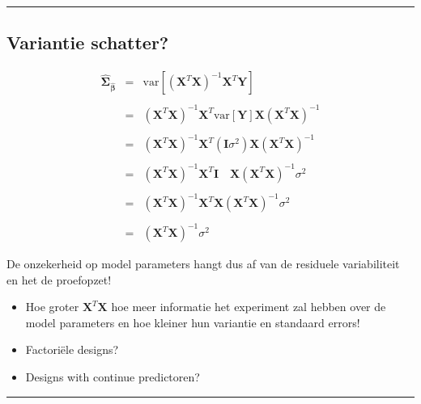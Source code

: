 \documentclass[
]{article}
\begin{document}
\begin{center}\rule{0.5\linewidth}{0.5pt}\end{center}

\hypertarget{variantie-schatter}{%
\subsection{Variantie schatter?}\label{variantie-schatter}}

\[
\begin{array}{ccl}
\hat{\boldsymbol{\Sigma}}_{\hat{\boldsymbol{\beta}}}
&=&\text{var}\left[(\mathbf{X}^T\mathbf{X})^{-1}\mathbf{X}^T\mathbf{Y}\right]\\\\
&=&(\mathbf{X}^T\mathbf{X})^{-1}\mathbf{X}^T\text{var}\left[\mathbf{Y}\right]\mathbf{X}(\mathbf{X}^T\mathbf{X})^{-1}\\\\
&=&(\mathbf{X}^T\mathbf{X})^{-1}\mathbf{X}^T(\mathbf{I}\sigma^2)\mathbf{X}(\mathbf{X}^T\mathbf{X})^{-1}
\\\\
&=&(\mathbf{X}^T\mathbf{X})^{-1}\mathbf{X}^T\mathbf{I}\quad\mathbf{X}(\mathbf{X}^T\mathbf{X})^{-1}\sigma^2\\\\
&=&(\mathbf{X}^T\mathbf{X})^{-1}\mathbf{X}^T\mathbf{X}(\mathbf{X}^T\mathbf{X})^{-1}\sigma^2\\\\
&=&(\mathbf{X}^T\mathbf{X})^{-1}\sigma^2
\end{array}
\]

De onzekerheid op model parameters hangt dus af van de residuele
variabiliteit en het de proefopzet!

\begin{itemize}
\item
  Hoe groter \(\mathbf{X}^T\mathbf{X}\) hoe meer informatie het
  experiment zal hebben over de model parameters en hoe kleiner hun
  variantie en standaard errors!
\item
  Factoriële designs?
\item
  Designs with continue predictoren?
\end{itemize}

\begin{center}\rule{0.5\linewidth}{0.5pt}\end{center}
\end{document}
